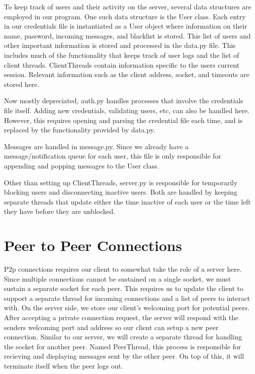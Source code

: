 \documentclass[12pt, ]{article}
\begin{document}
\begin{flushleft}
	To keep track of users and their activity on the server, several data structures are employed in our program. One such data structure is the User class.
	Each entry in our credentials file is instantiated as a User object where information on their name, password, incoming messages, and blacklist is stored.
	This list of users and other important information is stored and processed in the data.py file. This includes much of the functionality that keeps track of user logs and the list of client threads.
	ClientThreads contain information specific to the users current session. Relevant information such as the client address, socket, and timeouts are stored here.
\end{flushleft}

\begin{flushleft}
	Now mostly depreciated, auth.py handles processes that involve the credentials file itself. Adding new credentials, validating users, etc, can also be handled here. 
	However, this requires opening and parsing the credential file each time, and is replaced by the functionality provided by data.py.
\end{flushleft}

\begin{flushleft}
	Messages are handled in message.py. Since we already have a message/notification queue for each user, this file is only responsible for appending and popping messages to the User class.
\end{flushleft}

\begin{flushleft}
	Other than setting up ClientThreads, server.py is responsible for temporarily blocking users and disconnecting inactive users. 
	Both are handled by keeping separate threads that update either the time inactive of each user or the time left they have before they are unblocked.
\end{flushleft}

\newpage


\section{Peer to Peer Connections}

\begin{flushleft}
	P2p connections requires our client to somewhat take the role of a server here. Since multiple connections cannot be sustained on a single socket, we must sustain a separate socket for each peer.
	This requires us to update the client to support a separate thread for incoming connections and a list of peers to interact with. On the server side, we store our client's welcoming port for potential peers.
	After accepting a private connection request, the server will respond with the senders welcoming port and address so our client can setup a new peer connection. 
	Similar to our server, we will create a separate thread for handling the socket for another peer. Named PeerThread, this process is responsible for recieving and displaying messages sent by the other peer.
	On top of this, it will terminate itself when the peer logs out.
\end{flushleft}
\end{document}
